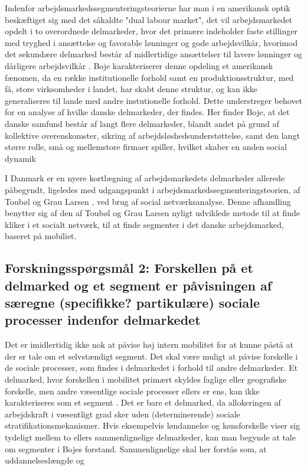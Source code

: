 Indenfor arbejdsmarkedssegmenteringsteorierne har man i en amerikansk optik beskæftiget sig med det såkaldte "dual labour market", det vil arbejdsmarkedet opdelt i to overordnede delmarkeder, hvor det primære indeholder faste stillinger med tryghed i ansættelse og favorable lønninger og gode arbejdsvilkår, hvorimod det sekundære delmarked består af midlertidige ansættelser til lavere lønninger og dårligere arbejdsvilkår \parencite{Piore1980}. Boje karakteriserer denne opdeling et amerikansk fænomen, da en række institutionelle forhold samt en produktionsstruktur, med få, store virksomheder i landet, har skabt denne struktur, og kan ikke generaliseres til lande med andre instutionelle forhold. Dette understreger behovet for en analyse af hvilke danske delmarkeder, der findes. Her finder Boje, at det danske samfund består af langt flere delmarkeder, blandt andet på grund af kollektive overenskomster, sikring af arbejdsløshedsunderstøttelse, samt den langt større rolle, små og mellemstore firmaer spiller, hvilket skaber en anden social dynamik \parencite[36]{Boje1985}

I Danmark er en nyere kortlægning af arbejdsmarkedets delmarkeder allerede påbegyndt, ligeledes med udgangspunkt i arbejdsmarkedssegmenteringsteorien, af Toubøl og Grau Larsen \parencite{Touboel2013}, ved brug af social netværksanalyse. Denne afhandling benytter sig af den af Toubøl og Grau Larsen nyligt udviklede metode til at finde kliker i et socialt netværk, til at finde segmenter i det danske arbejdsmarked, baseret på mobiliet.  

\subsection{Forskningsspørgsmål 2: Forskellen på et delmarked og et segment er påvisningen af særegne (specifikke? partikulære) sociale processer indenfor delmarkedet}

Det er imidlertidig ikke nok at påvise høj intern mobilitet for at kunne påstå at der er tale om et selvstændigt segment. Det skal være muligt at påvise forskelle i de sociale processer, som findes i delmarkedet i forhold til andre delmarkeder. Et delmarked, hvor forskellen i mobilitet primært skyldes faglige eller geografiske forskelle, men andre væsentlige sociale processer ellers er ens, kan ikke karakteriseres som et segment \parencite[41]{Boje1985}. Det er bare et delmarked, da allokeringen af arbejdskraft i væsentligt grad sker uden (determinerende) sociale stratifikationsmekanismer. Hvis eksempelvis løndannelse og kønsforskelle viser sig tydeligt mellem to ellers sammenlignelige delmarkeder, kan man begynde at tale om segmenter i Bojes forstand. Sammenlignelige skal her forstås som, at uddannelseslængde og 


